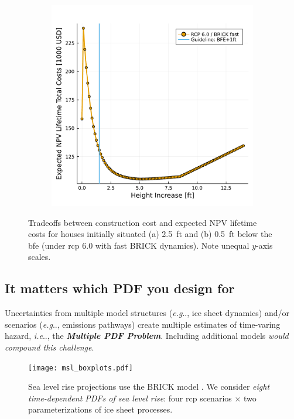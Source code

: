 \documentclass[12pt]{article}
\makeatletter
\DeclareRobustCommand\onedot{\futurelet\@let@token\@onedot}
\def\@onedot{\ifx\@let@token.\else.\null\fi\xspace}
\def\eg{\emph{e.g}\onedot} \def\Eg{\emph{E.g}\onedot}
\def\ie{\emph{i.e}\onedot} \def\Ie{\emph{I.e}\onedot}
\DeclareRobustCommand\onedot{\futurelet\@let@token\@onedot}
\def\@onedot{\ifx\@let@token.\else.\null\fi\xspace}
\def\eg{\emph{e.g}\onedot} \def\Eg{\emph{E.g}\onedot}
\def\ie{\emph{i.e}\onedot} \def\Ie{\emph{I.e}\onedot}
\makeatother
\begin{document}
\begin{figure}
\begin{subfigure}{0.48\textwidth}
        \includegraphics[width=\textwidth]{7.5.pdf}
    \end{subfigure}
    \caption{
        Tradeoffs between construction cost and expected NPV lifetime costs for houses initially situated (a) \SI{2.5}{ft} and (b) \SI{0.5}{ft} below the \gls{bfe} (under \gls{rcp} 6.0 with fast BRICK \cite{wong_brick0.2:2017} dynamics).
        Note unequal $y$-axis scales.
    }
\end{figure}

\subsection{It matters which PDF you design for}

Uncertainties from multiple model structures (\eg, ice sheet dynamics) and/or scenarios (\eg, emissions pathways) create multiple estimates of time-varing hazard, \ie, the \textbf{\itshape{Multiple PDF Problem}}.
Including additional models \citep[\eg,][]{kopp_evolving:2017,deconto_antarctica:2016,ruckert_coastal:2019} \emph{would compound this challenge}.
\begin{figure}
    \centering
    \texttt{[image: msl\_boxplots.pdf]}
    \caption{
        Sea level rise projections use the BRICK model \citep{wong_brick0.2:2017,ruckert_coastal:2019}.
        We consider \emph{eight time-dependent PDFs of sea level rise}: four \gls{rcp} scenarios $\times$ two parameterizations of ice sheet processes.
    }\label{fig:boxplots}
\end{figure}
\end{document}
